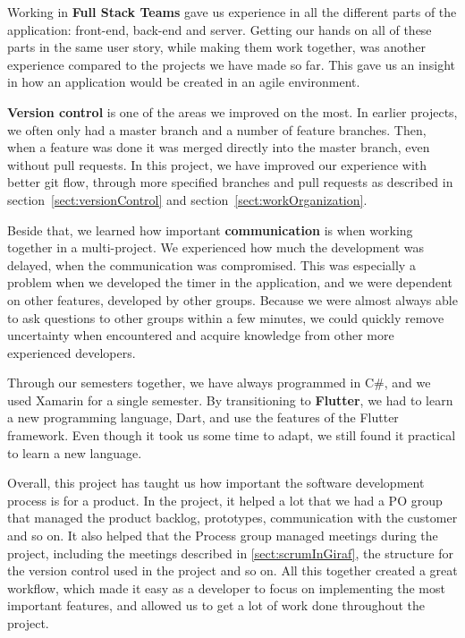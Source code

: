 Working in \textbf{Full Stack Teams} gave us experience in all the different parts of the application: front-end, back-end and server. Getting our hands on all of these parts in the same user story, while making them work together, was another experience compared to the projects we have made so far. This gave us an insight in how an application would be created in an agile environment.

\textbf{Version control} is one of the areas we improved on the most. In earlier projects, we often only had a master branch and a number of feature branches. Then, when a feature was done it was merged directly into the master branch, even without pull requests. In this project, we have improved our experience with better git flow, through more specified branches and pull requests as described in section~\ref{sect:versionControl} and section~\ref{sect:workOrganization}.

Beside that, we learned how important \textbf{communication} is when working together in a multi-project. We experienced how much the development was delayed, when the communication was compromised. This was especially a problem when we developed the timer in the application, and we were dependent on other features, developed by other groups. Because we were almost always able to ask questions to other groups within a few minutes, we could quickly remove uncertainty when encountered and acquire knowledge from other more experienced developers.

Through our semesters together, we have always programmed in C\#, and we used Xamarin for a single semester. By transitioning to \textbf{Flutter}, we had to learn a new programming language, Dart, and use the features of the Flutter framework. Even though it took us some time to adapt, we still found it practical to learn a new language.

Overall, this project has taught us how important the software development process is for a product. In the project, it helped a lot that we had a PO group that managed the product backlog, prototypes, communication with the customer and so on. It also helped that the Process group managed meetings during the project, including the meetings described in \ref{sect:scrumInGiraf}, the structure for the version control used in the project and so on.
All this together created a great workflow, which made it easy as a developer to focus on implementing the most important features, and allowed us to get a lot of work done throughout the project.






